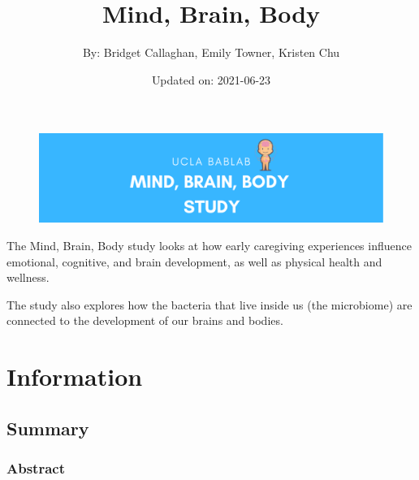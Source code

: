 \documentclass[]{book}
\title{Mind, Brain, Body}
\author{By: Bridget Callaghan, Emily Towner, Kristen Chu}
\date{Updated on: 2021-06-23}
\begin{document}
\maketitle

{
\setcounter{tocdepth}{1}
\tableofcontents
}
\hypertarget{section}{%
\chapter{}\label{section}}

\begin{figure}
\centering
\includegraphics{images/index/banner.png}
\caption{}
\end{figure}

The Mind, Brain, Body study looks at how early caregiving experiences influence emotional, cognitive, and brain development, as well as physical health and wellness.

The study also explores how the bacteria that live inside us (the microbiome) are connected to the development of our brains and bodies.

\hypertarget{information}{%
\chapter{Information}\label{information}}

\hypertarget{summary}{%
\section{Summary}\label{summary}}

\hypertarget{abstract}{%
\subsection{Abstract}\label{abstract}}
\end{document}
